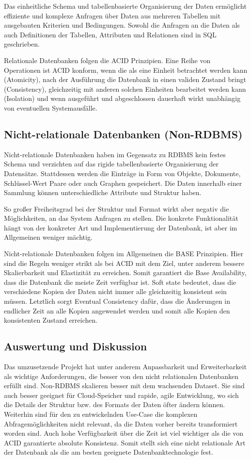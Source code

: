 Das einheitliche Schema und tabellenbasierte Organisierung der Daten ermöglicht effiziente und komplexe Anfragen über Daten aus mehreren Tabellen mit ausgebauten Kriterien und Bedingungen. Sowohl die Anfragen an die Daten als auch Definitionen der Tabellen, Attributen und Relationen sind in SQL geschrieben.

Relationale Datenbanken folgen die ACID Prinzipien. Eine Reihe von Operationen ist ACID konform, wenn die als eine Einheit betrachtet werden kann (Atomicity), nach der Ausführung die Datenbank in einen validen Zustand bringt (Consistency), gleichzeitig mit anderen solchen Einheiten bearbeitet werden kann (Isolation) und wenn ausgeführt und abgeschlossen dauerhaft wirkt unabhängig von eventuellen Systemausfälle.

\subsection*{\textbf{Nicht-relationale Datenbanken (Non-RDBMS)}}
Nicht-relationale Datenbanken haben im Gegensatz zu RDBMS kein festes Schema und verzichten auf das rigide tabellenbasierte Organisierung der Datensätze. Stattdessen werden die Einträge in Form von Objekte, Dokumente, Schlüssel-Wert Paare oder auch Graphen gespeichert. Die Daten innerhalb einer Sammlung können unterschiedliche Attribute und Struktur haben. 

So großer Freiheitsgrad bei der Struktur und Format wirkt aber negativ die Möglichkeiten, an das System Anfragen zu stellen. Die konkrete Funktionalität hängt von der konkreter Art und Implementierung der Datenbank, ist aber im Allgemeinen weniger mächtig.

Nicht-relationale Datenbanken folgen im Allgemeinen die BASE Prinzipien. Hier sind die Regeln weniger strikt als bei ACID mit dem Ziel, unter anderem bessere Skalierbarkeit und
Elastizität zu erreichen. Somit garantiert die Base Availability, dass die Datenbank die meiste Zeit verfügbar ist. Soft state bedeutet, dass die verschiedene Kopien der Daten nicht immer alle gleichzeitig konsistent sein müssen. Letztlich sorgt Eventual Consistency dafür, dass die Änderungen in endlicher Zeit an alle Kopien angewendet werden und somit alle Kopien den konsistenten Zustand erreichen.

\subsection{Auswertung und Diskussion}
Das umzusetzende Projekt hat unter anderem Anpassbarkeit und Erweiterbarkeit als wichtige Anforderungen, die besser von den nicht relationalen Datenbanken erfüllt sind. Non-RDBMS skalieren besser mit dem wachsenden Dataset. Sie sind auch besser geeignet für Cloud-Speicher und rapide, agile Entwicklung, wo sich die Details der Struktur bzw. des Formats der Daten öfter ändern können. Weiterhin sind für den zu entwickelnden Use-Case die komplexen Abfragemöglichkeiten nicht relevant, da die Daten vorher bereits transformiert worden sind. Auch hohe Verfügbarkeit über die Zeit ist viel wichtiger als die von ACID garantierte absolute Konsistenz. Somit stellt sich eine nicht relationale Art der Datenbank als die am besten geeignete Datenbanktechnologie fest.

